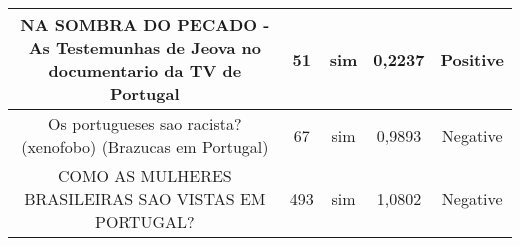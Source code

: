 \documentclass[11pt]{article}
\newlength\mylength
\begin{document}
\begin{center}
\begin{longtable}{||C{.40\mylength}||C{.20\mylength}||C{.20\mylength}||C{.30\mylength}||C{.20\mylength}||}
   NA SOMBRA DO PECADO - As Testemunhas de Jeova no documentario da TV de Portugal  & 51 & sim & 0,2237 & Positive \\  \hline
   Os portugueses sao racista? (xenofobo) (Brazucas em Portugal)  & 67 & sim & 0,9893 & Negative \\  \hline
   COMO AS MULHERES BRASILEIRAS SAO VISTAS EM PORTUGAL?  & 493 & sim & 1,0802 & Negative \\  \hline
  
\end{longtable}
\end{center}
\end{document}
